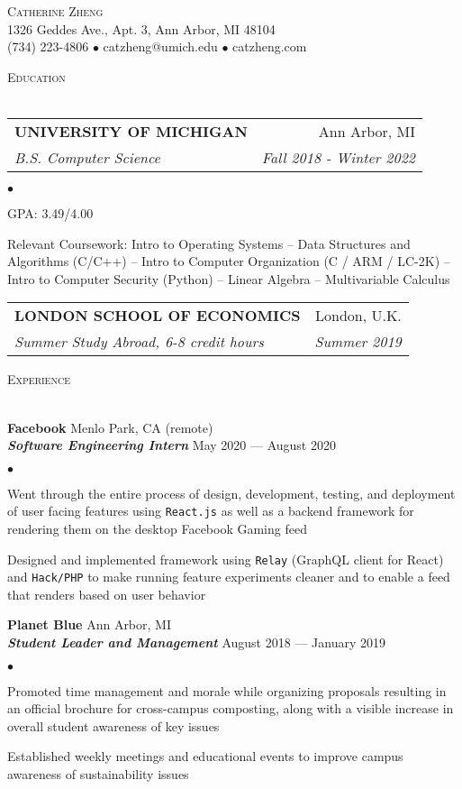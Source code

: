 \documentclass{article}
\makeatletter
\newcommand{\lineunder}{\vspace*{-8pt} \\ \hspace*{-20pt} \hrulefill \\}
\newcommand{\header}[1]{{\hspace*{-20pt}\vspace*{6pt} \large\textsc{#1}} \vspace*{-5pt} \lineunder \vspace{3pt}}
\newcommand{\employer}[4]{{ \normalsize\textbf{#1} \small\hfill{#2}\\ {\small\textbf{\emph{#3}}} \small\hfill{#4}\\ }}
\newcommand{\contact}[3]{
\vspace*{-5pt}
\begin{center}
{\huge \scshape {#1}}\\
\vspace{2pt}
#2\\
#3
\end{center}
\vspace*{-10pt}
}
\newenvironment{achievements}{\begin{list}{$\bullet$}{\topsep 0pt \itemsep 0pt}}{\vspace*{5pt}\end{list}}
\newcommand{\school}[4]{
\begin{tabular*}{6.55in}{l@{\extracolsep{\fill}}r}
	\uppercase{\normalsize\textbf{#1}} & #2 \\
	\textit{#3} & \textit{#4}\\
\end{tabular*}\vspace*{3pt}}
\makeatother
\begin{document}
\small
\smallskip
\vspace*{-40pt}

\contact{Catherine Zheng}
{\small1326 Geddes Ave., Apt. 3, Ann Arbor, MI 48104}
{\small(734) 223-4806 $\bullet$ catzheng@umich.edu  $\bullet$ catzheng.com}

\vspace{10pt}
\header{Education}

\vspace{1ex}
\school{University of Michigan}{Ann Arbor, MI}{B.S. Computer Science}{Fall 2018 - Winter 2022}
\begin{achievements}
\item GPA: 3.49/4.00
\item Relevant Coursework: Intro to Operating Systems -- Data Structures and Algorithms (C/C++) -- Intro to Computer Organization (C / ARM / LC-2K) -- Intro to Computer Security (Python) -- Linear Algebra -- Multivariable Calculus
\end{achievements}
\vspace{1pt}
\school{London School of Economics}{London, U.K.}{Summer Study Abroad, 6-8 credit hours}{Summer 2019}
\vspace{1pt}

\header{Experience}

\employer{Facebook}{Menlo Park, CA (remote)}{Software Engineering Intern}{May 2020 --- August 2020}
	\begin{achievements}
	\item Went through the entire process of design, development, testing, and deployment of user facing features using \texttt{React.js} as well as a backend framework for rendering them on the desktop Facebook Gaming feed
	\item Designed and implemented framework using \texttt{Relay} (GraphQL client for React) and \texttt{Hack/PHP} to make running feature experiments cleaner and to enable a feed that renders based on user behavior
	\end{achievements}

\employer{Planet Blue}{Ann Arbor, MI}{Student Leader and Management}{August 2018 --- January 2019}
	\begin{achievements}
	\item Promoted time management and morale while organizing proposals resulting in an official brochure for cross-campus composting, along with a visible increase in overall student awareness of key issues
	\item Established weekly meetings and educational events to improve campus awareness of sustainability issues
	\end{achievements}
\end{document}
